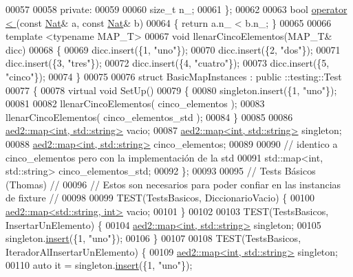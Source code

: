 \begin{DoxyCode}
00057 
00058     \textcolor{keyword}{private}:
00059 
00060         \textcolor{keywordtype}{size\_t} n\_;
00061 \};
00062 
00063 \textcolor{keywordtype}{bool} \hyperlink{classaed2_1_1map_a8ff07f6a24c290ea7e8f63ec7ab24f8d_a8ff07f6a24c290ea7e8f63ec7ab24f8d}{operator < }(\textcolor{keyword}{const} \hyperlink{classNat}{Nat}& a, \textcolor{keyword}{const} \hyperlink{classNat}{Nat}& b)
00064 \{ \textcolor{keywordflow}{return} a.n\_ < b.n\_; \}
00065 
00066 \textcolor{keyword}{template} <\textcolor{keyword}{typename} MAP\_T>
00067 \textcolor{keywordtype}{void} llenarCincoElementos(MAP\_T& dicc)
00068 \{
00069     dicc.insert(\{1, \textcolor{stringliteral}{"uno"}\});
00070     dicc.insert(\{2, \textcolor{stringliteral}{"dos"}\});
00071     dicc.insert(\{3, \textcolor{stringliteral}{"tres"}\});
00072     dicc.insert(\{4, \textcolor{stringliteral}{"cuatro"}\});
00073     dicc.insert(\{5, \textcolor{stringliteral}{"cinco"}\});
00074 \}
00075 
00076 \textcolor{keyword}{struct }BasicMapInstances : \textcolor{keyword}{public} ::testing::Test
00077 \{
00078     \textcolor{keyword}{virtual} \textcolor{keywordtype}{void} SetUp()
00079     \{
00080         singleton.insert(\{1, \textcolor{stringliteral}{"uno"}\});
00081 
00082         llenarCincoElementos( cinco\_elementos );
00083         llenarCincoElementos( cinco\_elementos\_std );
00084     \}
00085 
00086     \hyperlink{classaed2_1_1map}{aed2::map<int, std::string>} vacio;
00087     \hyperlink{classaed2_1_1map}{aed2::map<int, std::string>} singleton;
00088     \hyperlink{classaed2_1_1map}{aed2::map<int, std::string>} cinco\_elementos;
00089 
00090     \textcolor{comment}{// identico a cinco\_elementos pero con la implementación de la std}
00091     std::map<int, std::string> cinco\_elementos\_std;
00092 \};
00093 
00095 \textcolor{comment}{// Tests Básicos (Thomas)                                               //}
00096 \textcolor{comment}{// Estos son necesarios para poder confiar en las instancias de fixture //}
00098 \textcolor{comment}{}
00099 TEST(TestsBasicos, DiccionarioVacio) \{
00100     \hyperlink{classaed2_1_1map}{aed2::map<std::string, int>} vacio;
00101 \}
00102 
00103 TEST(TestsBasicos, InsertarUnElemento) \{
00104     \hyperlink{classaed2_1_1map}{aed2::map<int, std::string>} singleton;
00105     singleton.\hyperlink{classaed2_1_1map_a60aacba06b1579630b3c8e996cf248c8_a60aacba06b1579630b3c8e996cf248c8}{insert}(\{1, \textcolor{stringliteral}{"uno"}\});
00106 \}
00107 
00108 TEST(TestsBasicos, IteradorAlInsertarUnElemento) \{
00109     \hyperlink{classaed2_1_1map}{aed2::map<int, std::string>} singleton;
00110     \textcolor{keyword}{auto} it = singleton.\hyperlink{classaed2_1_1map_a60aacba06b1579630b3c8e996cf248c8_a60aacba06b1579630b3c8e996cf248c8}{insert}(\{1, \textcolor{stringliteral}{"uno"}\});

\end{DoxyCode}

